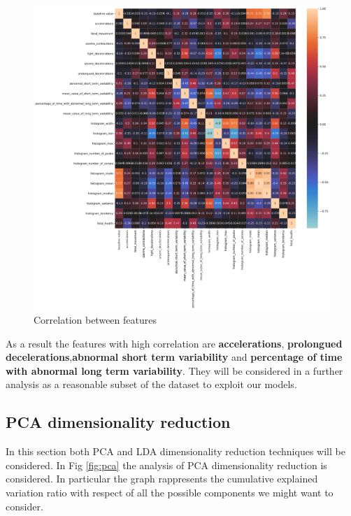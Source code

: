 \documentclass[a4paper,12pt]{article}
\begin{document}
\begin{figure}[H]
  \begin{center}
  \includegraphics[width=1.0\textwidth]{images/correlation.png}
  \end{center}
  \caption{Correlation between features}
  \label{fig:correlation}
\end{figure}

\noindent As a result the features with high correlation are \textbf{accelerations}, \textbf{prolongued decelerations},\textbf{abnormal short term variability} and \textbf{percentage of time with abnormal long term variability}. They will be considered in a further analysis as a reasonable subset of the dataset to exploit our models.

\subsection{PCA dimensionality reduction}
In this section both PCA and LDA dimensionality reduction techniques will be considered.
\bigbreak
\noindent In Fig \ref{fig:pca} the analysis of PCA dimensionality reduction is considered. In particular the graph rappresents the cumulative explained variation ratio with respect of all the possible components we might want to consider.
\end{document}
